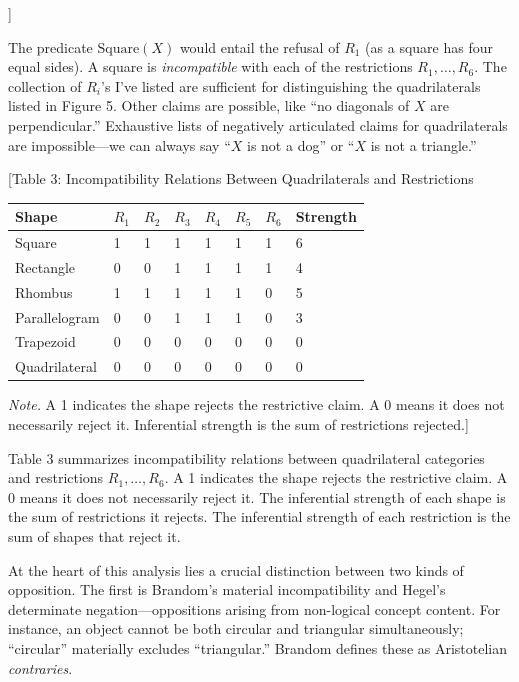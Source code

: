 \documentclass[12pt]{book}
\begin{document}
{]}

The predicate \(\text{Square}(X)\) would entail the refusal of \(R_1\) (as a square has four equal sides). A square is \emph{incompatible} with each of the restrictions \(R_1,\ldots,R_6\). The collection of \(R_i\)'s I've listed are sufficient for distinguishing the quadrilaterals listed in Figure 5. Other claims are possible, like ``no diagonals of \(X\) are perpendicular.'' Exhaustive lists of negatively articulated claims for quadrilaterals are impossible---we can always say ``\(X\) is not a dog'' or ``\(X\) is not a triangle.''

{[}Table 3: Incompatibility Relations Between Quadrilaterals and Restrictions

\begin{longtable}[]{@{}llllllll@{}}
\toprule\noalign{}
Shape & \(R_1\) & \(R_2\) & \(R_3\) & \(R_4\) & \(R_5\) & \(R_6\) & Strength \\
\midrule\noalign{}
\endhead
\bottomrule\noalign{}
\endlastfoot
Square & 1 & 1 & 1 & 1 & 1 & 1 & 6 \\
Rectangle & 0 & 0 & 1 & 1 & 1 & 1 & 4 \\
Rhombus & 1 & 1 & 1 & 1 & 1 & 0 & 5 \\
Parallelogram & 0 & 0 & 1 & 1 & 1 & 0 & 3 \\
Trapezoid & 0 & 0 & 0 & 0 & 0 & 0 & 0 \\
Quadrilateral & 0 & 0 & 0 & 0 & 0 & 0 & 0 \\
\end{longtable}

\emph{Note.} A 1 indicates the shape rejects the restrictive claim. A 0 means it does not necessarily reject it. Inferential strength is the sum of restrictions rejected.{]}

Table 3 summarizes incompatibility relations between quadrilateral categories and restrictions \(R_1,\ldots,R_6\). A 1 indicates the shape rejects the restrictive claim. A 0 means it does not necessarily reject it. The inferential strength of each shape is the sum of restrictions it rejects. The inferential strength of each restriction is the sum of shapes that reject it.

At the heart of this analysis lies a crucial distinction between two kinds of opposition. The first is Brandom's material incompatibility and Hegel's determinate negation---oppositions arising from non-logical concept content. For instance, an object cannot be both circular and triangular simultaneously; ``circular'' materially excludes ``triangular.'' Brandom defines these as Aristotelian \emph{contraries}.
\end{document}
